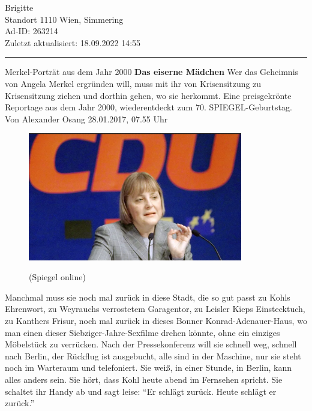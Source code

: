 \documentclass[
  letterpaper,
]{scrbook}
\begin{document}
Brigitte\\
Standort 1110 Wien, Simmering\\
Ad-ID: 263214\\
Zuletzt aktualisiert: 18.09.2022 14:55

\begin{center}\rule{0.5\linewidth}{0.5pt}\end{center}

Merkel-Porträt aus dem Jahr 2000 \textbf{Das eiserne Mädchen} Wer das
Geheimnis von Angela Merkel ergründen will, muss mit ihr von
Krisensitzung zu Krisensitzung ziehen und dorthin gehen, wo sie
herkommt. Eine preisgekrönte Reportage aus dem Jahr 2000, wiederentdeckt
zum 70. SPIEGEL-Geburtstag. Von Alexander Osang 28.01.2017, 07.55 Uhr

\begin{figure}

{\centering 

\href{https://www.spiegel.de/geschichte/angela-merkel-portraet-aus-dem-jahr-2000-das-eiserne-maedchen-a-1131489.html}{\includegraphics[width=3.69in,height=\textheight]{./pictures/Angela_Merkel_2000.png}}

}

\caption{(Spiegel online)}

\end{figure}

Manchmal muss sie noch mal zurück in diese Stadt, die so gut passt zu
Kohls Ehrenwort, zu Weyrauchs verrostetem Garagentor, zu Leisler Kieps
Einstecktuch, zu Kanthers Frisur, noch mal zurück in dieses Bonner
Konrad-Adenauer-Haus, wo man einen dieser Siebziger-Jahre-Sexfilme
drehen könnte, ohne ein einziges Möbelstück zu verrücken. Nach der
Pressekonferenz will sie schnell weg, schnell nach Berlin, der Rückflug
ist ausgebucht, alle sind in der Maschine, nur sie steht noch im
Warteraum und telefoniert. Sie weiß, in einer Stunde, in Berlin, kann
alles anders sein. Sie hört, dass Kohl heute abend im Fernsehen spricht.
Sie schaltet ihr Handy ab und sagt leise: ``Er schlägt zurück. Heute
schlägt er zurück.''
\end{document}
